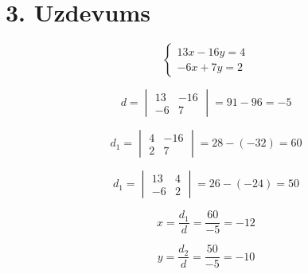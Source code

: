 \documentclass{article}
\begin{document}
\section*{3. Uzdevums}
\begin{equation*}
    \begin{cases}
        13x -16y = 4\\
        -6x + 7y = 2
    \end{cases}
\end{equation*}

\begin{equation*}
    d 
    = 
    \begin{vmatrix}
        13 & -16\\
        -6 & 7
    \end{vmatrix}
    =
    91 - 96
    =
    -5
\end{equation*}

\begin{equation*}
    d_1
    = 
    \begin{vmatrix}
        4 & -16\\
        2 & 7
    \end{vmatrix}
    =
    28 - (-32)
    =
    60
\end{equation*}

\begin{equation*}
    d_1
    = 
    \begin{vmatrix}
        13 & 4\\
        -6 & 2
    \end{vmatrix}
    =
    26 - (-24)
    =
    50
\end{equation*}

\begin{equation*}
    x
    =
    \frac{d_1}{d}
    =
    \frac{60}{-5}
    =
    -12
\end{equation*}

\begin{equation*}
    y
    =
    \frac{d_2}{d}
    =
    \frac{50}{-5}
    =
    -10
\end{equation*}
\end{document}
